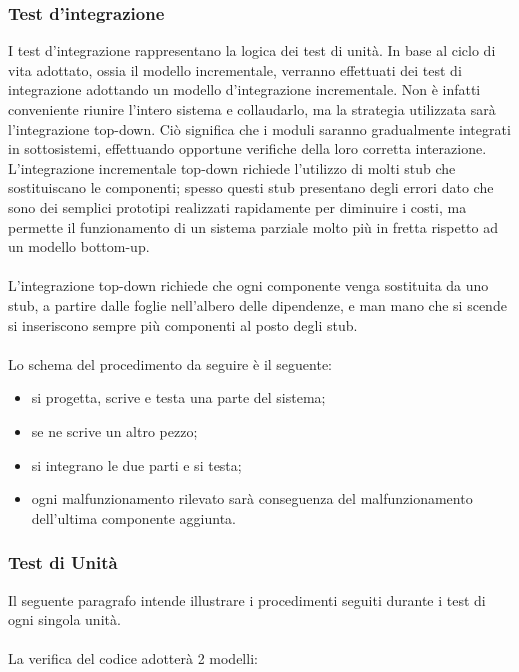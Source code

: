 \subsubsection*{Test d'integrazione}
I test d'integrazione rappresentano la logica dei test di unit\`a.
In base al ciclo di vita adottato, ossia il modello incrementale, verranno effettuati dei 
test di integrazione adottando un modello d'integrazione incrementale. 
Non \`e infatti conveniente riunire l'intero sistema e collaudarlo, ma la
strategia utilizzata sar\`a l'integrazione top-down. Ci\`o significa che i
moduli saranno gradualmente integrati in sottosistemi, effettuando opportune verifiche della loro  corretta interazione. 
L'integrazione incrementale top-down richiede l'utilizzo di molti stub che
sostituiscano le componenti; spesso questi stub presentano degli errori dato che sono dei semplici 
prototipi realizzati rapidamente per diminuire i costi, ma permette il funzionamento di 
un sistema parziale molto pi\`u in fretta rispetto ad un modello bottom-up.\\
\\
L'integrazione top-down richiede che ogni componente venga sostituita da uno
stub, a partire dalle foglie nell'albero delle dipendenze, e man mano che si scende si 
inseriscono sempre pi\`u componenti al posto degli stub. \\ \\
Lo schema del procedimento da seguire \`e il seguente:

\begin{itemize}
  \item si progetta, scrive e testa una parte del sistema;
  \item se ne scrive un altro pezzo;
  \item si integrano le due parti e si testa;
  \item ogni malfunzionamento rilevato sar\`a conseguenza del malfunzionamento
  dell'ultima componente aggiunta.
\end{itemize}


\subsubsection*{Test di Unit\`a}
Il seguente paragrafo intende illustrare i procedimenti seguiti durante i test
di ogni singola unit\`a.\\ \\
La verifica del codice adotter\`a 2 modelli:

